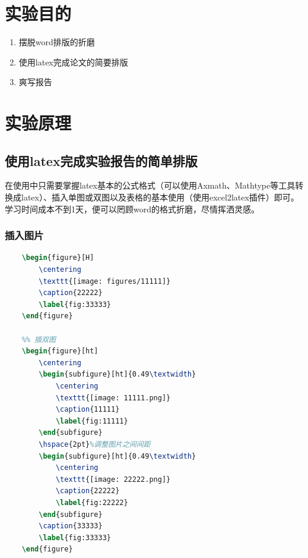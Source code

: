 \documentclass{cquptformat}
\begin{document}
	
\maketitle
\makeatother
\makeatletter

\section{实验目的}

\begin{enumerate}
	\item 摆脱word排版的折磨
	\item 使用latex完成论文的简要排版
	\item 爽写报告 
\end{enumerate}

\section{实验原理}

\subsection{使用latex完成实验报告的简单排版}

在使用中只需要掌握latex基本的公式格式（可以使用Axmath、Mathtype等工具转换成latex）、插入单图或双图以及表格的基本使用（使用excel2latex插件）即可。学习时间成本不到1天，便可以罔顾word的格式折磨，尽情挥洒灵感。


\subsubsection{插入图片}
\begin{lstlisting}[language=tex]
	%% 插单图
	\begin{figure}[H]
		\centering
		\texttt{[image: figures/11111]}
		\caption{22222}
		\label{fig:33333}
	\end{figure}
	
	%% 插双图
	\begin{figure}[ht]
		\centering
		\begin{subfigure}[ht]{0.49\textwidth}
			\centering
			\texttt{[image: 11111.png]}
			\caption{11111}
			\label{fig:11111}
		\end{subfigure}
		\hspace{2pt}%调整图片之间间距
		\begin{subfigure}[ht]{0.49\textwidth}
			\centering
			\texttt{[image: 22222.png]}
			\caption{22222}
			\label{fig:22222}
		\end{subfigure}
		\caption{33333}
		\label{fig:33333}
	\end{figure}
	
\end{lstlisting}
\end{document}
